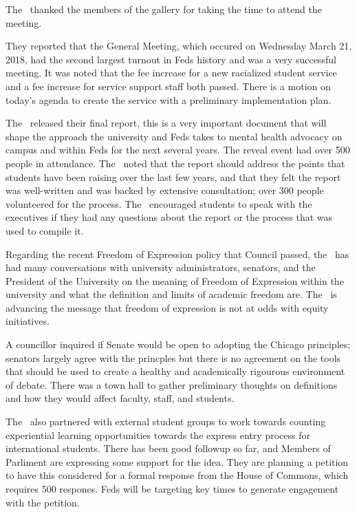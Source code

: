 \begin{information}

    The \pres\ thanked the members of the gallery for taking the time to attend 
    the meeting.

    They reported that the General Meeting, which occured on Wednesday March 
    21, 2018, had the second largest turnout in Feds history and was a very
    successful meeting. It was noted that the fee increase for a new racialized
    student service and a fee increase for service support staff both passed. 
    There is a motion on today's agenda to create the service with a 
    preliminary implementation plan.

    The \pacsmh\ released their final report, this is a very important document
    that will shape the approach the university and Feds takes to mental health
    advocacy on campus and within Feds for the next several years. The reveal
    event had over 500 people in attendance. The \pres\ noted that the report
    should address the points that students have been raising over the last few
    years, and that they felt the report was well-written and was backed by
    extensive consultation; over 300 people volunteered for the process. The 
    \pres\ encouraged students to speak with the executives if they had any 
    questions about the report or the process that was used to compile it.

    Regarding the recent Freedom of Expression policy that Council passed, the
    \pres\ has had many conversations with university administrators, senators,
    and the President of the University on the meaning of Freedom of Expression
    within the university and what the definition and limits of academic freedom
    are. The \pres\ is advancing the message that freedom of expression is not
    at odds with equity initiatives.

    A councillor inquired if Senate would be open to adopting the Chicago 
    principles; senators largely agree with the princples but there is no
    agreement on the tools that should be used to create a healthy and
    academically rigourous environment of debate. There was a town hall 
    to gather preliminary thoughts on definitions and how they would 
    affect faculty, staff, and students.

    The \pres\ also partnered with external student groups to work towards
    counting experiential learning opportunities towards the express entry
    process for international students. There has been good followup so far, 
    and Members of Parliment are expressing some support for the idea. They are
    planning a petition to have this considered for a formal response from the 
    House of Commons, which requires 500 respones. Feds will be targeting
    key times to generate engagement with the petition.


\end{information}
